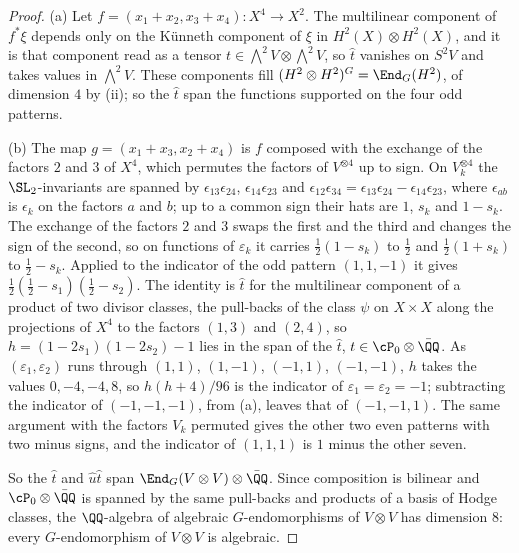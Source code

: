 \begin{proof}
(a) Let $f=(x_{1}+x_{2},x_{3}+x_{4})\colon X^{4}\to X^{2}$. The multilinear
component of $f^{*}\xi$ depends only on the K\"unneth component of $\xi$ in
$H^{2}(X)\otimes H^{2}(X)$, and it is that component read as a tensor
$t\in\bigwedge^{2}V\otimes\bigwedge^{2}V$, so $\hat{t}$ vanishes on $S^{2}V$
and takes values in $\bigwedge^{2}V$. These components fill
$(H^{2}\otimes H^{2})^{G}=\End_{G}(H^{2})$, of dimension $4$ by
(ii); so the $\hat{t}$ span the functions supported on
the four odd patterns.

(b) The map $g=(x_{1}+x_{3},x_{2}+x_{4})$ is $f$ composed with the exchange
of the factors $2$ and $3$ of $X^{4}$, which permutes the factors of
$V^{\otimes4}$ up to sign. On $V_{k}^{\otimes4}$ the $\SL_{2}$-invariants are
spanned by $\epsilon_{13}\epsilon_{24}$, $\epsilon_{14}\epsilon_{23}$ and
$\epsilon_{12}\epsilon_{34}=\epsilon_{13}\epsilon_{24}-\epsilon_{14}
\epsilon_{23}$, where $\epsilon_{ab}$ is $\epsilon_{k}$ on the factors $a$ and
$b$; up to a common sign their hats are $1$, $s_{k}$ and $1-s_{k}$. The
exchange of the factors $2$ and $3$ swaps the first and the third and changes
the sign of the second, so on functions of $\varepsilon_{k}$ it carries
$\frac12(1-s_{k})$ to $\frac12$ and $\frac12(1+s_{k})$ to $\frac12-s_{k}$.
Applied to the indicator of the odd pattern $(1,1,-1)$ it gives
$\frac12(\frac12-s_{1})(\frac12-s_{2})$. The identity is $\hat{t}$ for the
multilinear component of a product of two divisor classes, the pull-backs of
the class $\psi$ on $X\times X$ along the projections of $X^{4}$ to the
factors $(1,3)$ and $(2,4)$, so $h=(1-2s_{1})(1-2s_{2})-1$ lies in the span of the
$\hat{t}$, $t\in\cP_{0}\otimes\bar{\QQ}$. As $(\varepsilon_{1},\varepsilon_{2})$
runs through $(1,1)$, $(1,-1)$, $(-1,1)$, $(-1,-1)$, $h$ takes the values
$0,-4,-4,8$, so $h(h+4)/96$ is the indicator of
$\varepsilon_{1}=\varepsilon_{2}=-1$; subtracting the indicator of
$(-1,-1,-1)$, from (a), leaves that of $(-1,-1,1)$. The same argument with the
factors $V_{k}$ permuted gives the other two even patterns with two minus
signs, and the indicator of $(1,1,1)$ is $1$ minus the other seven.

So the $\hat{t}$ and $\hat{u}\hat{t}$ span $\End_{G}(V\otimes V)\otimes
\bar{\QQ}$. Since composition is bilinear and $\cP_{0}\otimes
\bar{\QQ}$ is spanned by the same pull-backs and products of a basis of
Hodge classes, the $\QQ$-algebra of algebraic $G$-endomorphisms of
$V\otimes V$ has dimension $8$: every $G$-endomorphism of $V\otimes V$ is
algebraic.


\end{proof}
